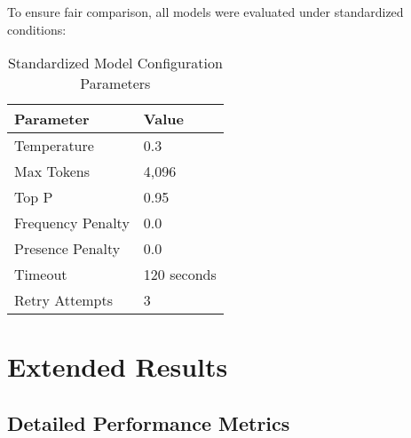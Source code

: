 \documentclass[11pt,a4paper]{article}
\begin{document}
To ensure fair comparison, all models were evaluated under standardized conditions:

\begin{table}[H]
\centering
\caption{Standardized Model Configuration Parameters}
\begin{tabular}{@{}ll@{}}
\toprule
\textbf{Parameter} & \textbf{Value} \\
\midrule
Temperature & 0.3 \\
Max Tokens & 4,096 \\
Top P & 0.95 \\
Frequency Penalty & 0.0 \\
Presence Penalty & 0.0 \\
Timeout & 120 seconds \\
Retry Attempts & 3 \\
\bottomrule
\end{tabular}
\end{table}

\section{Extended Results}
\label{app:results}

\subsection{Detailed Performance Metrics}
\end{document}
